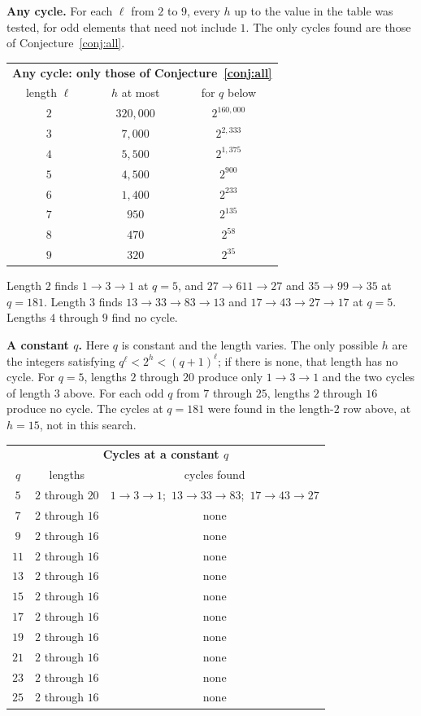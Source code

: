 \documentclass[11pt]{article}
\newcommand{\topic}[1]{\par\noindent\textbf{#1}}
\begin{document}
\topic{Any cycle.}
For each $\ell$ from $2$ to $9$, every $h$ up to the value in the table was tested, for odd elements that need not include $1$.
The only cycles found are those of Conjecture~\ref{conj:all}.
\begin{center}
\begin{tabular}{ccc}
\multicolumn{3}{c}{\textbf{Any cycle: only those of Conjecture~\ref{conj:all}}} \\[0.4em]
length $\ell$ & $h$ at most & for $q$ below \\
$2$ & $320{,}000$ & $2^{160{,}000}$ \\
$3$ & $7{,}000$ & $2^{2{,}333}$ \\
$4$ & $5{,}500$ & $2^{1{,}375}$ \\
$5$ & $4{,}500$ & $2^{900}$ \\
$6$ & $1{,}400$ & $2^{233}$ \\
$7$ & $950$ & $2^{135}$ \\
$8$ & $470$ & $2^{58}$ \\
$9$ & $320$ & $2^{35}$ \\
\end{tabular}
\end{center}
Length $2$ finds $1 \to 3 \to 1$ at $q = 5$, and $27 \to 611 \to 27$ and $35 \to 99 \to 35$ at $q = 181$.
Length $3$ finds $13 \to 33 \to 83 \to 13$ and $17 \to 43 \to 27 \to 17$ at $q = 5$.
Lengths $4$ through $9$ find no cycle.

\topic{A constant $q$.}
Here $q$ is constant and the length varies.
The only possible $h$ are the integers satisfying $q^\ell < 2^h < (q+1)^\ell$; if there is none, that length has no cycle.
For $q = 5$, lengths $2$ through $20$ produce only $1 \to 3 \to 1$ and the two cycles of length $3$ above.
For each odd $q$ from $7$ through $25$, lengths $2$ through $16$ produce no cycle.
The cycles at $q = 181$ were found in the length-$2$ row above, at $h = 15$, not in this search.
\begin{center}
\begin{tabular}{ccc}
\multicolumn{3}{c}{\textbf{Cycles at a constant $q$}} \\[0.4em]
$q$ & lengths & cycles found \\
$5$ & $2$ through $20$ & $1 \to 3 \to 1$;\ $13 \to 33 \to 83$;\ $17 \to 43 \to 27$ \\
$7$ & $2$ through $16$ & none \\
$9$ & $2$ through $16$ & none \\
$11$ & $2$ through $16$ & none \\
$13$ & $2$ through $16$ & none \\
$15$ & $2$ through $16$ & none \\
$17$ & $2$ through $16$ & none \\
$19$ & $2$ through $16$ & none \\
$21$ & $2$ through $16$ & none \\
$23$ & $2$ through $16$ & none \\
$25$ & $2$ through $16$ & none \\
\end{tabular}
\end{center}
\end{document}
